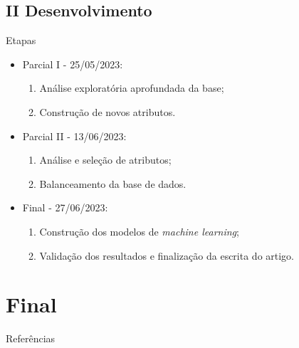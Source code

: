 \documentclass{beamer}
\begin{document}
\subsection{II Desenvolvimento}

\begin{frame}{Etapas}
    
    \begin{itemize}[<+-| alert@+>]
        \setlength{\itemsep}{10pt}
        \item Parcial I - 25/05/2023:
        \begin{enumerate}
            \item Análise exploratória aprofundada da base;
            \item Construção de novos atributos. 
        \end{enumerate}

        \item Parcial II - 13/06/2023:
        \begin{enumerate}
            \item Análise e seleção de atributos;
            \item Balanceamento da base de dados.
        \end{enumerate}

        \item Final - 27/06/2023:
        \begin{enumerate}
            \item Construção dos modelos de \emph{machine learning};
            \item Validação dos resultados e finalização da escrita do artigo.
        \end{enumerate}
    \end{itemize}
    
\end{frame}

\section*{Final}

\begin{frame}[allowframebreaks]{Referências}
    \scriptsize
    
\end{frame}
\end{document}

